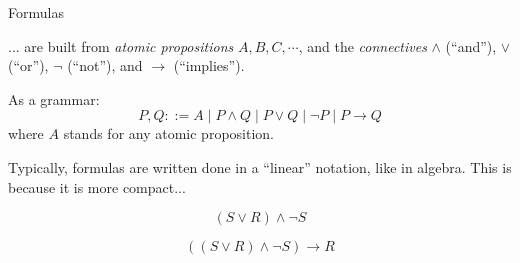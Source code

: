 \documentclass[xetex,aspectratio=169,14pt,hyperref={pdfpagelabels=true,pdflang={en-GB}}]{beamer}
\begin{document}
\begin{frame}
  {Formulas}

  ... are built from \emph{atomic propositions} $A, B, C, \cdots$, and
  the \emph{connectives} $\land$ (``and''), $\lor$ (``or''), $\lnot$
  (``not''), and $\to$ (``implies'').

  \medskip

  As a grammar:
  \begin{displaymath}
    P, Q ::= A \mid P \land Q \mid P \lor Q \mid \lnot P \mid P \to Q
  \end{displaymath}
  where $A$ stands for any atomic proposition.

  \bigskip

  Typically, formulas are written done in a ``linear'' notation, like
  in algebra. This is because it is more compact...

\end{frame}

\begin{frame}
  \centering

  \pause
  \begin{displaymath}
    (S \lor R) \land \lnot S
  \end{displaymath}
\end{frame}

\begin{frame}
  \centering

  \pause
  \begin{displaymath}
    ((S \lor R) \land \lnot S) \to R
  \end{displaymath}
\end{frame}
\end{document}
